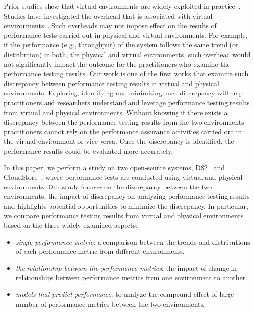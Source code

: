 \documentclass[smallextended]{svjour3}       %
\begin{document}
Prior studies show that virtual environments are widely exploited in practice~\cite{Cito:2015:MCA:2786805.2786826,Nguyen:2012:ADP:2188286.2188344,xiong2013vperfguard}. Studies have investigated the overhead that is associated with virtual environments~\cite{menon2005diagnosing}. Such overheads may not impose effect on the results of performance tests carried out in physical and virtual environments. For example, if the performance (e.g., throughput) of the system follows the same trend (or distribution) in both, the physical and virtual environments, such overhead would not significantly impact the outcome for the practitioners who examine the performance testing results. Our work is one of the first works that examine such discrepancy between performance testing results in virtual and physical environments. Exploring, identifying and minimizing such discrepancy will help practitioners and researchers understand and leverage performance testing results from virtual and physical environments. Without knowing if there exists a discrepancy between the performance testing results from the two environments practitioners cannot rely on the performance assurance activities carried out in the virtual environment or vice versa. Once the discrepancy is identified, the performance results could be evaluated more accurately.

In this paper, we perform a study on two open-source systems, DS2~\cite{delldvd} and CloudStore~\cite{cloudstore}, where performance tests are conducted using virtual and physical environments. Our study focuses on the discrepancy between the two environments, the impact of discrepancy on analyzing performance testing results and highlights potential opportunities to minimize the discrepancy. In particular, we compare performance testing results from virtual and physical environments based on the three widely examined aspects:
\begin{itemize}
	\item \textit{single performance metric}: a comparison between the trends and distributions of each performance metric from different environments.
	\item \textit{the relationship between the performance metrics}: the impact of change in relationships between performance metrics from one environment to another.
	\item \textit{models that predict performance}: to analyze the compound effect of large number of performance metrics between the two environments.
	
\end{itemize}
\end{document}
